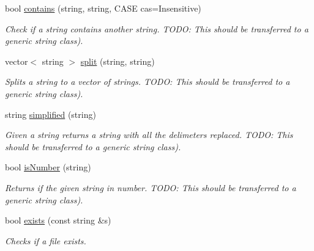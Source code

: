 \begin{DoxyCompactItemize}
\mbox{\label{classIO_aca502a6a0d7f32718cca9005ae729c4a}} 
bool \mbox{\hyperlink{classIO_aca502a6a0d7f32718cca9005ae729c4a}{contains}} (string, string, C\+A\+SE cas=Insensitive)
\begin{DoxyCompactList}\small\item\em Check if a string contains another string. T\+O\+DO\+: This should be transferred to a generic string class). \end{DoxyCompactList}\item 
vector$<$ string $>$ \mbox{\hyperlink{classIO_a33419de8dcf51c88e18c8e66a9644d6c}{split}} (string, string)
\begin{DoxyCompactList}\small\item\em Splits a string to a vector of strings. T\+O\+DO\+: This should be transferred to a generic string class). \end{DoxyCompactList}\item 
\mbox{\label{classIO_ab60a7df8f29335c81c5a8b8ba3d6ea58}} 
string \mbox{\hyperlink{classIO_ab60a7df8f29335c81c5a8b8ba3d6ea58}{simplified}} (string)
\begin{DoxyCompactList}\small\item\em Given a string returns a string with all the delimeters replaced. T\+O\+DO\+: This should be transferred to a generic string class). \end{DoxyCompactList}\item 
\mbox{\label{classIO_a79e0886ebe243149d56296b2f57d8f19}} 
bool \mbox{\hyperlink{classIO_a79e0886ebe243149d56296b2f57d8f19}{is\+Number}} (string)
\begin{DoxyCompactList}\small\item\em Returns if the given string in number. T\+O\+DO\+: This should be transferred to a generic string class). \end{DoxyCompactList}\item 
\mbox{\label{classIO_a1f89e3dabdeb1571eace90943e31b500}} 
bool \mbox{\hyperlink{classIO_a1f89e3dabdeb1571eace90943e31b500}{exists}} (const string \&s)
\begin{DoxyCompactList}\small\item\em Checks if a file exists. \end{DoxyCompactList}\item 
\mbox{\label{classIO_a3a359eb873a40e3bf55b64b0ca1ced5f}} 

\end{DoxyCompactItemize}
